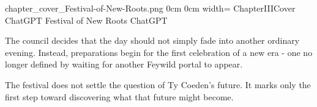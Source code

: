 	{chapter_cover_Festival-of-New-Roots.png}	%
	{0cm}										%
	{0cm}										%
	{width=\paperwidth}							%
	{ChapterIIICover}							%
	{ChatGPT}									%
	{Festival of New Roots}						%
	{ChatGPT}									%
	

{\entryfont The council decides that the day should not simply fade into another ordinary evening. Instead, preparations begin for the first celebration of a new era - one no longer defined by waiting for another Feywild portal to appear.

The festival does not settle the question of Ty Coeden's future. It marks only the first step toward discovering what that future might become.}





